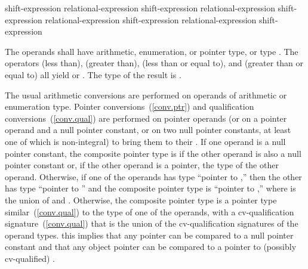 %
%
%
%
%
%
%
%
%
\begin{bnf}
\br
    shift-expression\br
    relational-expression \terminal{<} shift-expression\br
    relational-expression \terminal{>} shift-expression\br
    relational-expression \terminal{<=} shift-expression\br
    relational-expression \terminal{>=} shift-expression
\end{bnf}

The operands shall have arithmetic, enumeration, or pointer type, or type . The
operators \tcode{<} (less than), \tcode{>} (greater than), \tcode{<=}
(less than or equal to), and \tcode{>=} (greater than or equal to) all
yield  or . The type of the result is
.

\pnum
The usual arithmetic conversions are performed on operands of arithmetic
or enumeration type. Pointer conversions~(\ref{conv.ptr}) and
qualification conversions~(\ref{conv.qual}) are performed on pointer
operands (or on a pointer operand and a null pointer constant, or on two
null pointer constants, at least one of which is non-integral) to bring
them to their . If one operand is a
null pointer constant, the composite pointer type is
 if the other operand is also a null pointer constant or,
if the other operand is a pointer,
the type of the
other operand. Otherwise, if one of the operands has type ``pointer to
 ,'' then the other has type ``pointer to
 '' and the composite pointer type is ``pointer to
 ,'' where  is the union of
 and . Otherwise, the composite pointer type is
a pointer type similar~(\ref{conv.qual}) to the type of one of the
operands, with a cv-qualification signature~(\ref{conv.qual}) that is
the union of the cv-qualification signatures of the operand types.
\enternote 
{}%
this implies
that any pointer can be compared to a null pointer constant and that any
object pointer can be compared to a pointer to (possibly cv-qualified)
.
\exitnote 
\enterexample 

